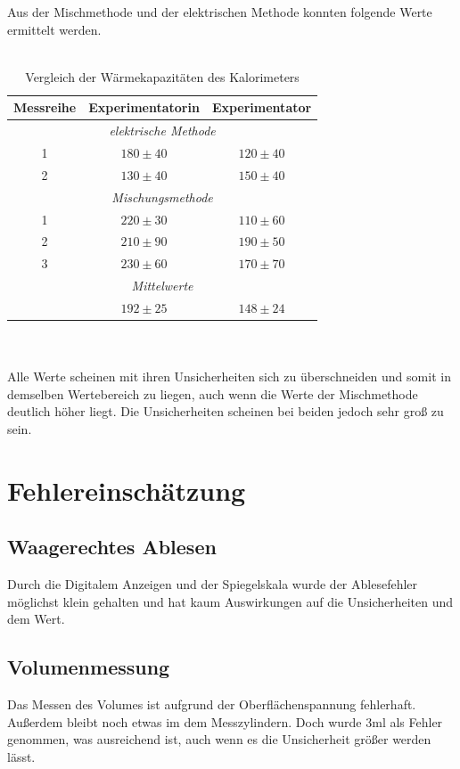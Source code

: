 \documentclass[bibliography=totocnumbered]{scrartcl}
\begin{document}
	Aus der Mischmethode und der elektrischen Methode konnten folgende Werte ermittelt werden.\\\\
	\begin{table}[ht!]
		\centering
		\caption[Vergleich]{Vergleich der Wärmekapazitäten des Kalorimeters}
		\begin{tabular}{|c||c|c|}
			\hline
			\textbf{Messreihe} & \textbf{Experimentatorin} & \textbf{Experimentator} \\
			\hline\hline
			\multicolumn{3}{|c|}{\textit{elektrische Methode}} \\
			\hline\hline
			1 & $ 180\pm40 $ & $120 \pm 40$ \\
			\hline
			2 & $ 130\pm 40$ &$ 150\pm40 $  \\
			\hline\hline
			\multicolumn{3}{|c|}{\textit{Mischungsmethode}} \\
			\hline\hline
			1 & $ 220\pm30 $ &$ 110\pm60 $  \\
			\hline
			2 & $ 210\pm90 $ & $ 190\pm 50$ \\
			\hline
			3 & $ 230\pm60 $ & $170 \pm 70$ \\
			\hline\hline
			\multicolumn{3}{|c|}{\textit{Mittelwerte}} \\
			\hline\hline
			& $192 \pm 25$ & $ 148\pm 24$ \\
			\hline
		\end{tabular}
		\label{tab: Vergleich}
	\end{table}
	\\\\
	Alle Werte scheinen mit ihren Unsicherheiten sich zu überschneiden und somit in demselben Wertebereich zu
	liegen, auch wenn die Werte der Mischmethode deutlich höher liegt. Die Unsicherheiten scheinen bei beiden jedoch sehr groß zu sein.
	
	\section{Fehlereinschätzung}
	
	 \subsection{Waagerechtes Ablesen}
		Durch die Digitalem Anzeigen und der Spiegelskala wurde der Ablesefehler möglichst klein gehalten und hat kaum Auswirkungen auf die Unsicherheiten und dem Wert.
		 \subsection{Volumenmessung}
		Das Messen des Volumes ist aufgrund der Oberflächenspannung fehlerhaft. Außerdem bleibt noch
		etwas im dem Messzylindern. Doch wurde 3ml als Fehler genommen, was ausreichend ist, auch
		wenn es die Unsicherheit größer werden lässt.
\end{document}
